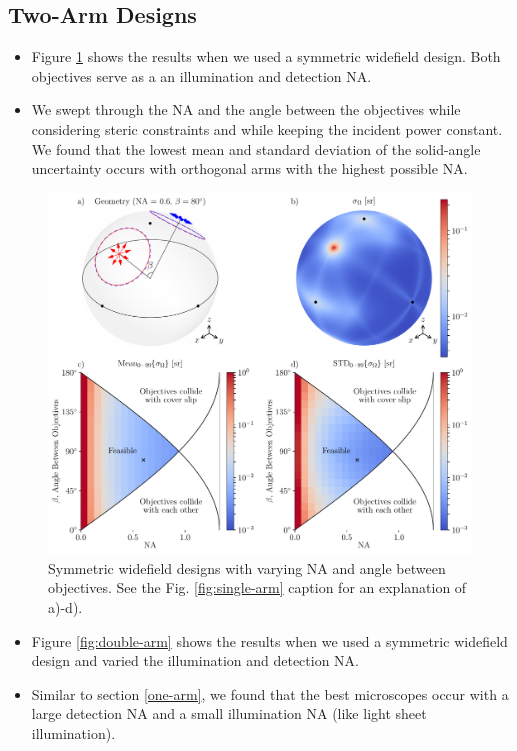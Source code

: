 \documentclass[10pt]{article}
\begin{document}
\subsection{Two-Arm Designs}
\begin{itemize}
\item Figure \ref{fig:symmetric-widefield} shows the results when we used a
  symmetric widefield design. Both objectives serve as a an illumination and
  detection NA.
\item We swept through the NA and the angle between the objectives while
  considering steric constraints and while keeping the incident power constant. 
  We found that the lowest mean and standard deviation of the solid-angle
  uncertainty occurs with orthogonal arms with the highest possible NA. 
\end{itemize}

\begin{figure}[htbp]
\centering\includegraphics[width=\textwidth]{symmetric-widefield}
\caption{Symmetric widefield designs with varying NA and angle between objectives. See the Fig. \ref{fig:single-arm} caption for an explanation of a)-d).}
\label{fig:symmetric-widefield}
\end{figure}

\begin{itemize}
\item Figure \ref{fig:double-arm} shows the results when we used a
  symmetric widefield design and varied the illumination and detection NA. 
\item Similar to section \ref{one-arm}, we found that the best microscopes occur
  with a large detection NA and a small illumination NA (like light sheet illumination).
\end{itemize}
\end{document}
